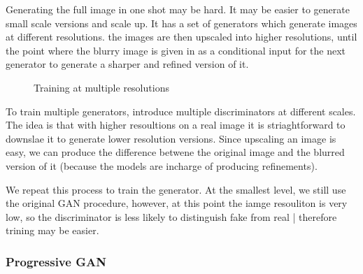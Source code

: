 \documentclass[11pt]{article}
\begin{document}
Generating the full image in one shot may be hard. It may be easier to generate small scale versions and scale up. It has a set of generators which generate images at different resolutions. the images are then upscaled into higher resolutions, until the point where the blurry image is given in as a conditional input for the next generator to generate a sharper and refined version of it.

\begin{figure}[H]
    \centering
    \caption*{Training at multiple resolutions}
\end{figure}

To train multiple generators, introduce multiple discriminators at different scales. The idea is that with higher resoultions on a real image it is striaghtforward to downslae it to generate  lower resolution versions. Since upscaling an image is easy, we can produce the difference betwene the original image and the blurred version of it (because the models are incharge of producing refinements).

We repeat this process to train the generator. At the smallest level, we still use the original GAN procedure, however, at this point the iamge resouliton is very low, so the discriminator is less likely to distinguish fake from real | therefore trining may be easier.

\subsubsection{Progressive GAN}
\end{document}
